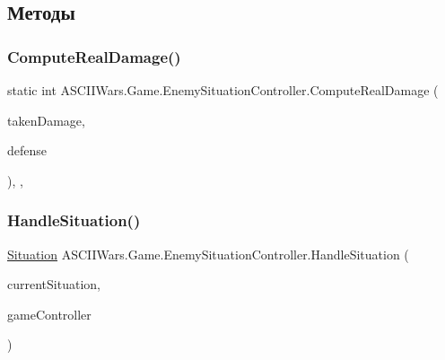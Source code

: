 \subsection{Методы}
\hypertarget{class_a_s_c_i_i_wars_1_1_game_1_1_enemy_situation_controller_afb7c1fe0420b219d35d8fbf892333e02}{}\label{class_a_s_c_i_i_wars_1_1_game_1_1_enemy_situation_controller_afb7c1fe0420b219d35d8fbf892333e02} 
\subsubsection{\texorpdfstring{Compute\+Real\+Damage()}{ComputeRealDamage()}}
{\footnotesize\ttfamily static int A\+S\+C\+I\+I\+Wars.\+Game.\+Enemy\+Situation\+Controller.\+Compute\+Real\+Damage (\begin{DoxyParamCaption}\item[{int}]{taken\+Damage,  }\item[{int}]{defense }\end{DoxyParamCaption})\hspace{0.3cm}{\ttfamily [inline]}, {\ttfamily [static]}, {\ttfamily [private]}}

\hypertarget{class_a_s_c_i_i_wars_1_1_game_1_1_enemy_situation_controller_a90db7af0d04e0ca4ee9231f63c0a6dd3}{}\label{class_a_s_c_i_i_wars_1_1_game_1_1_enemy_situation_controller_a90db7af0d04e0ca4ee9231f63c0a6dd3} 
\subsubsection{\texorpdfstring{Handle\+Situation()}{HandleSituation()}}
{\footnotesize\ttfamily \hyperlink{class_a_s_c_i_i_wars_1_1_game_1_1_situation}{Situation} A\+S\+C\+I\+I\+Wars.\+Game.\+Enemy\+Situation\+Controller.\+Handle\+Situation (\begin{DoxyParamCaption}\item[{\hyperlink{class_a_s_c_i_i_wars_1_1_game_1_1_situation}{Situation}}]{current\+Situation,  }\item[{\hyperlink{class_a_s_c_i_i_wars_1_1_game_1_1_game_controller}{Game\+Controller}}]{game\+Controller }\end{DoxyParamCaption})\hspace{0.3cm}{\ttfamily [inline]}}




